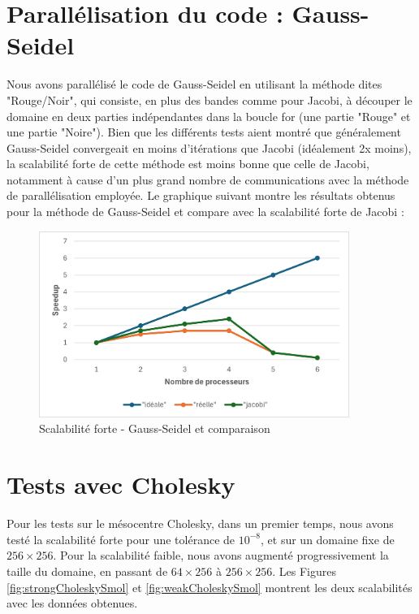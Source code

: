 \documentclass{article}
\begin{document}
\section{Parallélisation du code : Gauss-Seidel}


Nous avons parallélisé le code de Gauss-Seidel en utilisant la méthode dites "Rouge/Noir", qui consiste, en plus des bandes comme pour Jacobi, à découper le domaine en deux parties indépendantes dans la boucle for (une partie "Rouge" et une partie "Noire"). Bien que les différents tests aient montré que généralement Gauss-Seidel convergeait en moins d'itérations que Jacobi (idéalement 2x moins), la scalabilité forte de cette méthode est moins bonne que celle de Jacobi, notamment à cause d'un plus grand nombre de communications avec la méthode de parallélisation employée. Le graphique suivant montre les résultats obtenus pour la méthode de Gauss-Seidel et compare avec la scalabilité forte de Jacobi :

\begin{figure}[H]
    \centering
    \includegraphics[width=0.9\textwidth]{strong_scaling_gs.png}
    \caption{Scalabilité forte - Gauss-Seidel et comparaison}
    \label{fig:strongGS}
\end{figure}


\section{Tests avec Cholesky}


Pour les tests sur le mésocentre Cholesky, dans un premier temps, nous avons testé la scalabilité forte pour une tolérance de $10^{-8}$, et sur un domaine fixe de $256\times 256$. Pour la scalabilité faible, nous avons augmenté progressivement la taille du domaine, en passant de $64\times 256$ à $256\times 256$. Les Figures \ref{fig:strongCholeskySmol} et \ref{fig:weakCholeskySmol} montrent les deux scalabilités avec les données obtenues.
\end{document}
